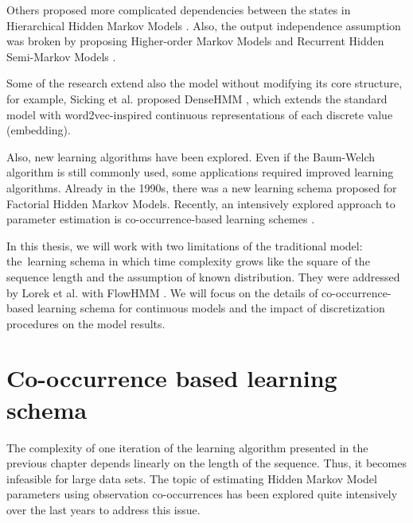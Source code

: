 \documentclass[shortabstract]{iithesis}
\begin{document}
Others proposed more complicated dependencies between the states in Hierarchical Hidden Markov Models \cite{fine_hierarchical_1998}. Also, the output independence assumption was broken by proposing Higher-order Markov Models  \cite{zhang_high-order_2019} and  Recurrent Hidden Semi-Markov Models \cite{liu_structured_2018}. 

Some of the research extend also the model without modifying its core structure, for example, Sicking et al. proposed DenseHMM \cite{sicking_densehmm_2022}, which extends the standard model with word2vec-inspired continuous representations of each discrete value (embedding). 

Also, new learning algorithms have been explored. Even if the Baum-Welch algorithm is still commonly used, some applications required improved learning algorithms. Already in the 1990s, there was a new learning schema proposed for Factorial Hidden Markov Models. Recently, an intensively explored approach to parameter estimation is co-occurrence-based learning schemes \cite{lakshminarayanan_non-negative_2010-1}. 

In this thesis, we will work with two limitations of the traditional model: \linebreak the~learning schema in which time complexity grows like the square of the sequence length and the assumption of known distribution. They were addressed by Lorek et al. with FlowHMM \cite{lorek2022flowhmm}. 
We will focus on the details of co-occurrence-based learning schema for continuous models and the impact of discretization procedures on the model results.   %



\pagebreak

\chapter{Co-occurrence based learning schema} \label{sec:cooc_theory}

The complexity of one iteration of the learning algorithm presented in the previous chapter depends linearly on the length of the sequence. Thus, it becomes infeasible for large data sets. The topic of estimating Hidden Markov Model parameters using observation co-occurrences has been explored quite intensively over the last years \cite{lakshminarayanan_non-negative_2010-1} \cite{lorek2022flowhmm} \cite{ sicking_densehmm_2022} to address this issue.
\end{document}
